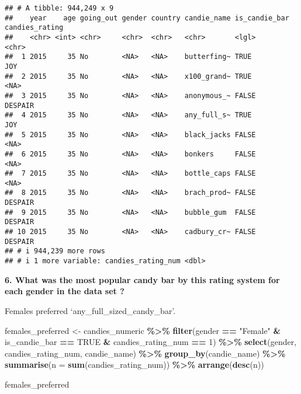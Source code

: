 \documentclass[
]{article}
\newenvironment{Shaded}{\begin{snugshade}}{\end{snugshade}}
\newcommand{\AttributeTok}[1]{\textcolor[rgb]{0.13,0.29,0.53}{#1}}
\newcommand{\ConstantTok}[1]{\textcolor[rgb]{0.56,0.35,0.01}{#1}}
\newcommand{\DecValTok}[1]{\textcolor[rgb]{0.00,0.00,0.81}{#1}}
\newcommand{\FunctionTok}[1]{\textcolor[rgb]{0.13,0.29,0.53}{\textbf{#1}}}
\newcommand{\NormalTok}[1]{#1}
\newcommand{\OtherTok}[1]{\textcolor[rgb]{0.56,0.35,0.01}{#1}}
\newcommand{\SpecialCharTok}[1]{\textcolor[rgb]{0.81,0.36,0.00}{\textbf{#1}}}
\newcommand{\StringTok}[1]{\textcolor[rgb]{0.31,0.60,0.02}{#1}}
\begin{document}
\begin{verbatim}
## # A tibble: 944,249 x 9
##    year    age going_out gender country candie_name is_candie_bar candies_rating
##    <chr> <int> <chr>     <chr>  <chr>   <chr>       <lgl>         <chr>         
##  1 2015     35 No        <NA>   <NA>    butterfing~ TRUE          JOY           
##  2 2015     35 No        <NA>   <NA>    x100_grand~ TRUE          <NA>          
##  3 2015     35 No        <NA>   <NA>    anonymous_~ FALSE         DESPAIR       
##  4 2015     35 No        <NA>   <NA>    any_full_s~ TRUE          JOY           
##  5 2015     35 No        <NA>   <NA>    black_jacks FALSE         <NA>          
##  6 2015     35 No        <NA>   <NA>    bonkers     FALSE         <NA>          
##  7 2015     35 No        <NA>   <NA>    bottle_caps FALSE         <NA>          
##  8 2015     35 No        <NA>   <NA>    brach_prod~ FALSE         DESPAIR       
##  9 2015     35 No        <NA>   <NA>    bubble_gum  FALSE         DESPAIR       
## 10 2015     35 No        <NA>   <NA>    cadbury_cr~ FALSE         DESPAIR       
## # i 944,239 more rows
## # i 1 more variable: candies_rating_num <dbl>
\end{verbatim}

\textbf{6. What was the most popular candy bar by this rating system for
each gender in the data set ?}

Females preferred `any\_full\_sized\_candy\_bar'.

\begin{Shaded}
\begin{Highlighting}[]
\NormalTok{females\_preferred }\OtherTok{\textless{}{-}}\NormalTok{ candies\_numeric }\SpecialCharTok{\%\textgreater{}\%} 
  \FunctionTok{filter}\NormalTok{(gender }\SpecialCharTok{==} \StringTok{"Female"} \SpecialCharTok{\&}\NormalTok{ is\_candie\_bar }\SpecialCharTok{==} \ConstantTok{TRUE} \SpecialCharTok{\&}\NormalTok{ candies\_rating\_num }\SpecialCharTok{==} \DecValTok{1}\NormalTok{) }\SpecialCharTok{\%\textgreater{}\%}
  \FunctionTok{select}\NormalTok{(gender, candies\_rating\_num, candie\_name) }\SpecialCharTok{\%\textgreater{}\%}
  \FunctionTok{group\_by}\NormalTok{(candie\_name) }\SpecialCharTok{\%\textgreater{}\%} 
  \FunctionTok{summarise}\NormalTok{(}\AttributeTok{n =} \FunctionTok{sum}\NormalTok{(candies\_rating\_num)) }\SpecialCharTok{\%\textgreater{}\%} 
  \FunctionTok{arrange}\NormalTok{(}\FunctionTok{desc}\NormalTok{(n)) }
  
\NormalTok{females\_preferred }
\end{Highlighting}
\end{Shaded}
\end{document}
